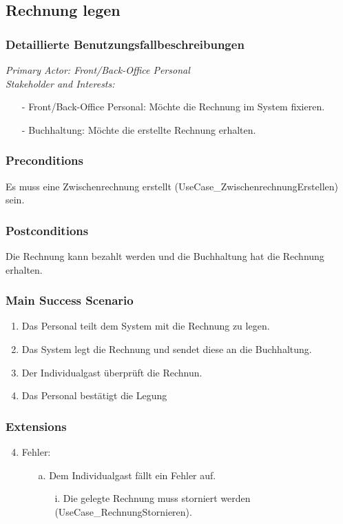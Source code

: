 \documentclass[./detailed_overview_usecases.tex]{subfiles}
\begin{document}
    \subsection{Rechnung legen}
    \subsubsection{Detaillierte Benutzungsfallbeschreibungen}
    \textit{Primary Actor: Front/Back-Office Personal}
    \\
    \textit{Stakeholder and Interests:}
    \begin{itemize}
        \item[-] Front/Back-Office Personal: Möchte die Rechnung im System fixieren.
        \item[-] Buchhaltung: Möchte die erstellte Rechnung erhalten.
    \end{itemize}

    \subsubsection*{Preconditions}
    Es muss eine Zwischenrechnung erstellt (UseCase_ZwischenrechnungErstellen) sein.

    \subsubsection*{Postconditions}
    Die Rechnung kann bezahlt werden und die Buchhaltung hat die Rechnung erhalten.

    \subsubsection*{Main Success Scenario}
    \begin{enumerate}
        \item Das Personal teilt dem System mit die Rechnung zu legen.
        \item Das System legt die Rechnung und sendet diese an die Buchhaltung.
        \item Der Individualgast überprüft die Rechnun.
        \item Das Personal bestätigt die Legung
    \end{enumerate}

    \subsubsection*{Extensions}
    \begin{enumerate}
        \setcounter{enumi}{3}
        \item Fehler:
        \begin{itemize}
            \item[a.] Dem Individualgast fällt ein Fehler auf.
            \begin{itemize}
                \item[i.] Die gelegte Rechnung muss storniert werden (UseCase_RechnungStornieren).
            \end{itemize}
        \end{itemize}
    \end{enumerate}
\end{document}
